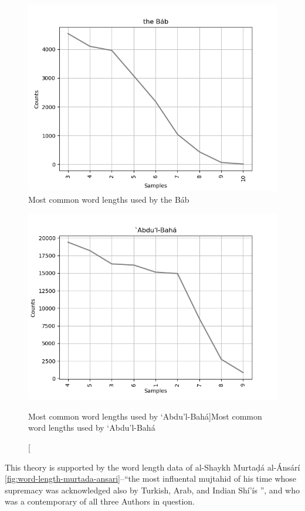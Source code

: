 \documentclass[12pt, oneside]{report}
\begin{document}
\begin{figure}[htb]
	\centering
	\includegraphics[width=15cm]{figures/word-length-bab.png}
	\caption[Most common word lengths used by the B\'{a}b]{Most common word lengths used by the B\'{a}b}
	\label{fig:word-length-bab}
\end{figure}
\begin{figure}[htb]
	\centering
	\includegraphics[width=15cm]{figures/word-length-abdulbaha.png}
	\caption[Most common word lengths used by `Abdu'l-Bah\'{a}]{Most common word lengths used by `Abdu'l-Bah\'{a}}
	\label{fig:word-length-abdulbaha}
\end{figure}
\par
This theory is supported by the word length data of al-Shaykh Murtaḍ\'{a} al-\'{A}ns\'{a}r\'{i} \autoref{fig:word-length-murtada-ansari}–``the most influental mujtahid of his time whose supremacy was acknowledged also by Turkish, Arab, and Indian Sh\'{i}'\'{i}s \cite{abd_al-hadi_hairi_shiism_1977}'', and who was a contemporary of all three Authors in question.
\end{document}

